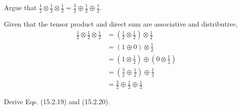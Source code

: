 \documentclass[../principles-of-quantum-mechanics.tex]{subfiles}
\begin{document}
\begin{questions}
		\question Argue that $\tfrac{1}{2} \otimes \tfrac{1}{2} \otimes \tfrac{1}{2} = \tfrac{3}{2}\oplus \tfrac{1}{2} \oplus \tfrac{1}{2}$.
		
		\begin{solution}
			Given that the tensor product and direct sum are associative and distributive,
			\begin{align*}
				\tfrac{1}{2}\otimes\tfrac{1}{2}\otimes\tfrac{1}{2} &= (\tfrac{1}{2}\otimes\tfrac{1}{2})\otimes\tfrac{1}{2} \\
				&= (1 \oplus 0)\otimes\tfrac{1}{2} \\
				&= (1 \otimes \tfrac{1}{2}) \oplus (0 \otimes\tfrac{1}{2}) \\
				&= (\tfrac{3}{2}\oplus \tfrac{1}{2}) \oplus \tfrac{1}{2} \\
				&= \tfrac{3}{2} \oplus \tfrac{1}{2} \oplus \tfrac{1}{2}
			\end{align*}
		\end{solution}
	
		\question Derive Eqs. (15.2.19) and (15.2.20).
		

\end{questions}
\end{document}
